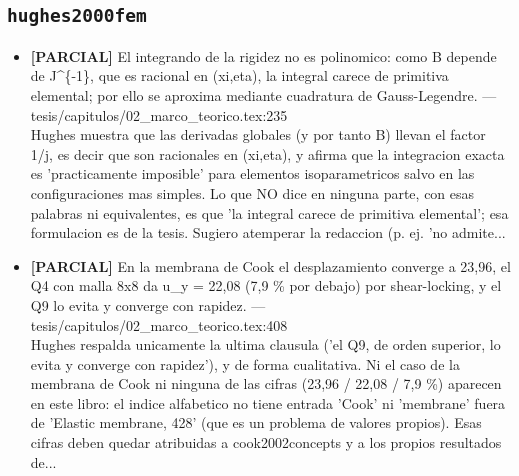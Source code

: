 \documentclass[11pt,a4paper]{article}
\newcommand{\campo}[1]{\textcolor{gris}{\footnotesize #1}}
\begin{document}
\subsection{\texttt{hughes2000fem}}
\begin{itemize}\small
\item \textbf{[PARCIAL]} El integrando de la rigidez no es polinomico: como B depende de J\textasciicircum{}\{-1\}, que es racional en (xi,eta), la integral carece de primitiva elemental; por ello se aproxima mediante cuadratura de Gauss-Legendre. --- tesis/capitulos/02\_marco\_teorico.tex:235
\\ \campo{Hughes muestra que las derivadas globales (y por tanto B) llevan el factor 1/j, es decir que son racionales en (xi,eta), y afirma que la integracion exacta es 'practicamente imposible' para elementos isoparametricos salvo en las configuraciones mas simples. Lo que NO dice en ninguna parte, con esas palabras ni equivalentes, es que 'la integral carece de primitiva elemental'; esa formulacion es de la tesis. Sugiero atemperar la redaccion (p. ej. 'no admite...}
\item \textbf{[PARCIAL]} En la membrana de Cook el desplazamiento converge a 23,96, el Q4 con malla 8x8 da u\_y = 22,08 (7,9 \% por debajo) por shear-locking, y el Q9 lo evita y converge con rapidez. --- tesis/capitulos/02\_marco\_teorico.tex:408
\\ \campo{Hughes respalda unicamente la ultima clausula ('el Q9, de orden superior, lo evita y converge con rapidez'), y de forma cualitativa. Ni el caso de la membrana de Cook ni ninguna de las cifras (23,96 / 22,08 / 7,9 \%) aparecen en este libro: el indice alfabetico no tiene entrada 'Cook' ni 'membrane' fuera de 'Elastic membrane, 428' (que es un problema de valores propios). Esas cifras deben quedar atribuidas a cook2002concepts y a los propios resultados de...}
\end{itemize}
\end{document}
